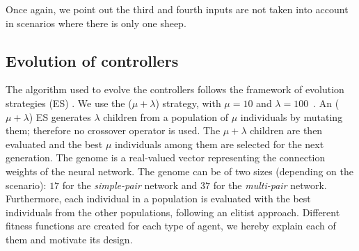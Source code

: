 \documentclass[conference]{IEEEtran}
\begin{document}
Once again, we point out the third and fourth inputs are not taken into account in scenarios where there is only one sheep. 

\subsection{Evolution of controllers}
\label{sec:controllers_evolution}
The algorithm used to evolve the controllers follows the framework of evolution strategies (ES) \cite{back1993overview}. 
We use the ($\mu + \lambda$) strategy, with $\mu = 10$ and $\lambda = 100$~\cite{eiben2003introduction}. 
An ($\mu + \lambda$) ES generates $\lambda$ children from a population of $\mu$ individuals by mutating them; therefore no crossover operator is used.
The $\mu + \lambda$ children are then evaluated and the best $\mu$ individuals among them are selected for the next generation.
The genome is a real-valued vector representing the connection weights of the neural network.
The genome can be of two sizes (depending on the scenario): $17$ for the \textit{simple-pair} network and $37$ for the \textit{multi-pair} network. 
Furthermore, each individual in a population is evaluated with the best individuals from the other populations, following an elitist approach.
Different fitness functions are created for each type of agent, we hereby explain each of them and motivate its design.

\vspace{0.5em}
\end{document}
